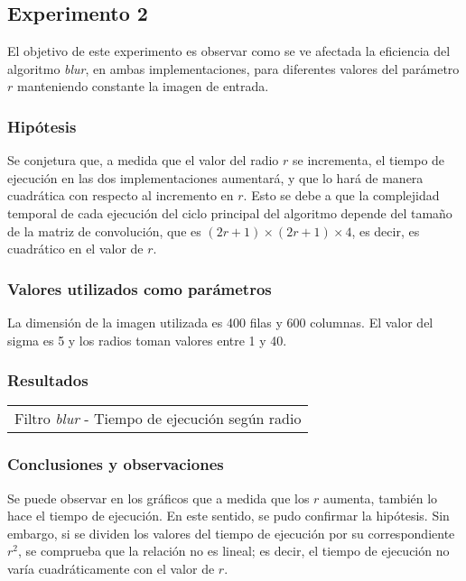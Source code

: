     \subsection{Experimento 2}
        El objetivo de este experimento es observar como se ve afectada la eficiencia del algoritmo \emph{blur}, en ambas implementaciones, para diferentes valores del parámetro $r$ manteniendo constante la imagen de entrada.

        \subsubsection*{Hipótesis} 
            Se conjetura que, a medida que el valor del radio $r$ se incrementa, el tiempo de ejecución en las dos implementaciones aumentará, y que lo hará de manera cuadrática con respecto al incremento en $r$. Esto se debe a que la complejidad temporal de cada ejecución del ciclo principal del algoritmo depende del tamaño de la matriz de convolución, que es $(2r + 1) \times (2r + 1) \times 4$, es decir, es cuadrático en el valor de $r$.

        \subsubsection*{Valores utilizados como parámetros} 
        La dimensión de la imagen utilizada es 400 filas y 600 columnas. El valor del sigma es 5 y los radios toman valores entre 1 y 40.

        \subsubsection*{Resultados}

            {\centering \begin{tabular}{c}
                {\small Filtro \emph{blur} - Tiempo de ejecución según radio} \\
            \end{tabular}}

        \subsubsection*{Conclusiones y observaciones}
            Se puede observar en los gráficos que a medida que los $r$ aumenta, también lo hace el tiempo de ejecución. En este sentido, se pudo confirmar la hipótesis. Sin embargo, si se dividen los valores del tiempo de ejecución por su correspondiente $r^2$, se comprueba que la relación no es lineal; es decir, el tiempo de ejecución no varía cuadráticamente con el valor de $r$.


